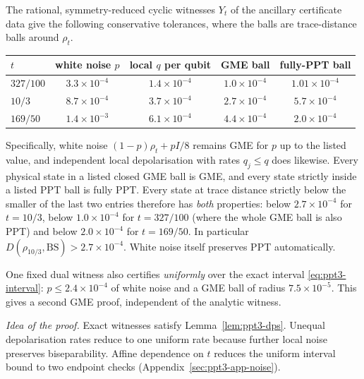\begin{corollary}\label{cor:ppt3-noise}
The rational, symmetry-reduced cyclic witnesses $Y_t$ of the ancillary certificate data give the following conservative tolerances, where the balls are trace-distance balls
around $\rho_t$.
\begin{center}
\small\setlength{\tabcolsep}{5pt}
\begin{tabular}{@{}lcccc@{}}\toprule
$t$ & white noise $p$ & local $q$ per qubit &
 GME ball & fully-PPT ball\\\midrule
$327/100$ & $3.3\times10^{-4}$ & $1.4\times10^{-4}$ &
 $1.0\times10^{-4}$ & $1.01\times10^{-4}$\\
$10/3$ & $8.7\times10^{-4}$ & $3.7\times10^{-4}$ &
 $2.7\times10^{-4}$ & $5.7\times10^{-4}$\\
$169/50$ & $1.4\times10^{-3}$ & $6.1\times10^{-4}$ &
 $4.4\times10^{-4}$ & $2.0\times10^{-4}$\\\bottomrule
\end{tabular}
\end{center}
Specifically, white noise
$(1-p)\rho_t+pI/8$ remains GME for $p$ up to the listed
value, and independent local depolarisation with rates
$q_j\le q$ does likewise. Every physical state in a listed closed GME ball is GME, and every
state strictly inside a listed PPT ball is fully PPT. Every state at trace distance
strictly below the smaller of the last two entries therefore has \emph{both} properties:
below $2.7\times10^{-4}$ for $t=10/3$, below $1.0\times10^{-4}$ for $t=327/100$ (where the
whole GME ball is also PPT) and below $2.0\times10^{-4}$ for $t=169/50$.
In particular $D(\rho_{10/3},\mathrm{BS})>2.7\times10^{-4}$.
White noise itself preserves PPT automatically.

One fixed dual witness also certifies \emph{uniformly}
over the exact interval \eqref{eq:ppt3-interval}:
$p\le2.4\times10^{-4}$ of white noise and a GME ball
of radius $7.5\times10^{-5}$. This gives a second GME proof, independent of the analytic witness.
\end{corollary}

\emph{Idea of the proof.} Exact witnesses satisfy Lemma~\ref{lem:ppt3-dps}. Unequal depolarisation rates reduce to one
uniform rate because further local noise preserves biseparability. Affine dependence on $t$ reduces the uniform
interval bound to two endpoint checks (Appendix~\ref{sec:ppt3-app-noise}).

